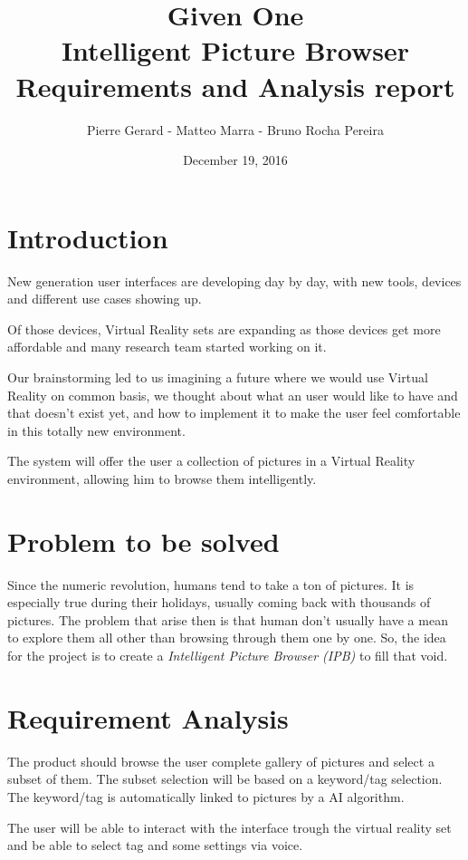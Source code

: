 \documentclass[11pt,a4paper]{article}
\author{Pierre Gerard - Matteo Marra - Bruno Rocha Pereira}
\title{Given One \\ Intelligent Picture Browser \\ Requirements and Analysis report}
\date{December 19, 2016}
\begin{document}
\maketitle

\section{Introduction}

New generation user interfaces are developing day by day, with new tools, devices and different use cases showing up.

Of those devices, Virtual Reality sets are expanding as those devices get more affordable and many research team started working on it. 

Our brainstorming led to us imagining a future where we would use Virtual Reality on common basis, we thought about what an user would like to have and that doesn't exist yet, and how to implement it to make the user feel comfortable in this totally new environment. 

The system will offer the user a collection of pictures in a Virtual Reality environment, allowing him to browse them intelligently.

\section{Problem to be solved}

Since the numeric revolution, humans tend to take a ton of pictures. It is especially true during their holidays, usually coming back with thousands of pictures. The problem that arise then is that human don't usually have a mean to explore them all other than browsing through them one by one. So, the idea for the project is to create a \textit{Intelligent Picture Browser (IPB)} to fill that void.

\section{Requirement Analysis} \label{requi}

The product should browse the user complete gallery of pictures and select a subset of them. The subset selection will be based on a keyword/tag selection. The keyword/tag is automatically linked to pictures by a AI algorithm.

The user will be able to interact with the interface trough the virtual reality set and be able to select tag and some settings via voice.
\end{document}
